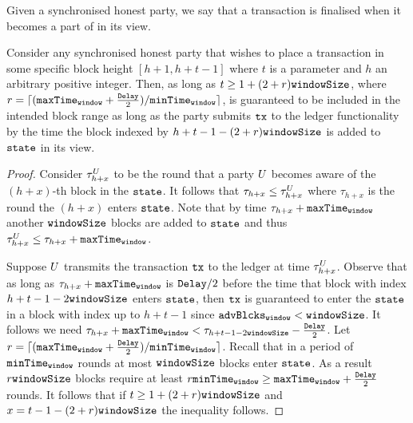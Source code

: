   Given a synchronised honest party, we say that a transaction \tx is
  finalised when it becomes a part of \state in its view.

  \begin{proposition}
    Consider any synchronised  honest party that wishes to place a transaction
    \tx in some specific block height $[h+1, h+t-1]$ where $t$ is a parameter
    and $h$ an arbitrary positive integer. Then, as long as $t\geq 1+(2+r)\texttt{windowSize}$, where $r = \lceil (\texttt{maxTime}_\texttt{window} +  \frac{\texttt{Delay}}{2})/ \texttt{minTime}_\texttt{window} \rceil$, \tx is
    guaranteed to be included in the intended block range as long as the party
    submits $\texttt{tx}$ to the ledger functionality 
    by the time the block indexed by $h+ t - 1 - (2+r) \texttt{windowSize}$
    is added to $\texttt{state}$ in its view.
  \end{proposition}

  \begin{proof}
Consider $\tau^{U}_{h+x}$ to be 
the round that a party $U$  becomes aware of the 
$(h+x)$-th block in the $\texttt{state}$. It follows that 
$\tau_{h+x} \leq \tau^{U}_{h+x}$ where $\tau_{h+x}$ is the round the $(h+x)$ enters $\texttt{state}$. Note that by time $\tau_{h+x} + \texttt{maxTime}_\texttt{window}$ another $\texttt{windowSize}$
blocks are added to $\texttt{state}$ and thus $\tau^{U}_{h+x} 
\leq \tau_{h+x}  + \texttt{maxTime}_\texttt{window}$. 

Suppose $U$ transmits the transaction $\texttt{tx}$
to the ledger at time $\tau^{U}_{h+x}$. Observe that as
long as $\tau_{h+x} + \texttt{maxTime}_\texttt{window}$ is $\texttt{Delay}/2$ 
before the time that block with index $h+t-1-2\texttt{windowSize}$ 
enters $\texttt{state}$, then $\texttt{tx}$ is guaranteed to enter the $\texttt{state}$ in a 
block with index up to $h+t-1$ since $\texttt{advBlcks}_\texttt{window}<\texttt{windowSize}$. 
It follows we need
$\tau_{h+x}  + \texttt{maxTime}_\texttt{window} < \tau_{h+t-1-2\texttt{windowSize}} - \frac{\texttt{Delay}}{2} $. 
Let $r = \lceil (\texttt{maxTime}_\texttt{window} +  \frac{\texttt{Delay}}{2})/ \texttt{minTime}_\texttt{window} \rceil$.
Recall that in a period of $\texttt{minTime}_\texttt{window}$ rounds at most $\texttt{windowSize}$
blocks enter $\texttt{state}$. As a result $r \texttt{windowSize}$ blocks require
at least $r \texttt{minTime}_\texttt{window} \geq \texttt{maxTime}_\texttt{window} +  \frac{\texttt{Delay}}{2}$ rounds. 
It follows that if $t \geq 1+(2+r)\texttt{windowSize}$
and $x = t - 1 - (2+r) \texttt{windowSize}$
the inequality follows. 
  \end{proof}


